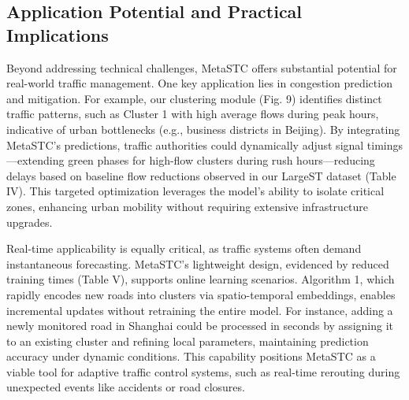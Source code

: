 \documentclass[lettersize,journal]{IEEEtran}
\begin{document}
\subsection{Application Potential and Practical Implications}

Beyond addressing technical challenges, MetaSTC offers substantial potential for real-world traffic management. One key application lies in congestion prediction and mitigation. For example, our clustering module (Fig. 9) identifies distinct traffic patterns, such as Cluster 1 with high average flows during peak hours, indicative of urban bottlenecks (e.g., business districts in Beijing). By integrating MetaSTC’s predictions, traffic authorities could dynamically adjust signal timings—extending green phases for high-flow clusters during rush hours—reducing delays based on baseline flow reductions observed in our LargeST dataset (Table IV). This targeted optimization leverages the model’s ability to isolate critical zones, enhancing urban mobility without requiring extensive infrastructure upgrades. 


Real-time applicability is equally critical, as traffic systems often demand instantaneous forecasting. MetaSTC’s lightweight design, evidenced by reduced training times (Table V), supports online learning scenarios. Algorithm 1, which rapidly encodes new roads into clusters via spatio-temporal embeddings, enables incremental updates without retraining the entire model. For instance, adding a newly monitored road in Shanghai could be processed in seconds by assigning it to an existing cluster and refining local parameters, maintaining prediction accuracy under dynamic conditions. This capability positions MetaSTC as a viable tool for adaptive traffic control systems, such as real-time rerouting during unexpected events like accidents or road closures.
\end{document}
